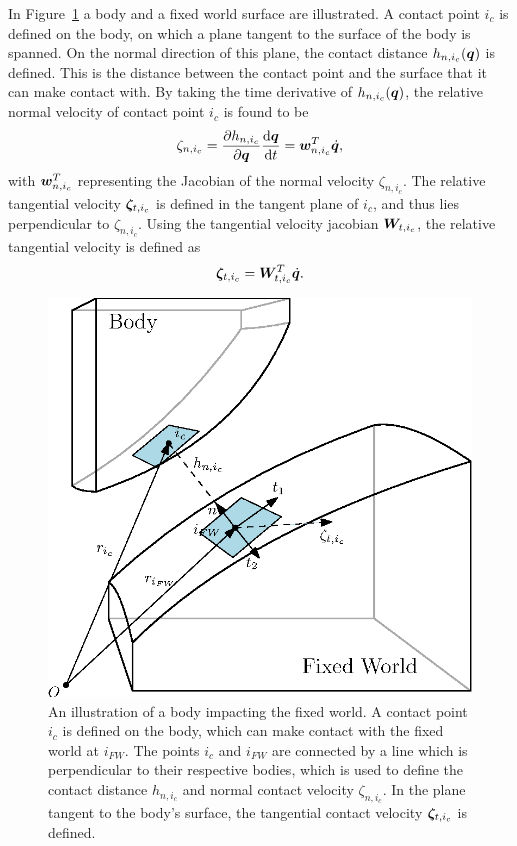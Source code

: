\documentclass[../DC2017114Bouma.tex]{subfiles}
\begin{document}
In Figure~\ref{fig:contactplanes} a body and a fixed world surface are illustrated. A contact point $i_c$ is defined on the body, on which a plane tangent to the surface of the body is spanned. On the normal direction of this plane, the contact distance $h_{n,i_c}({\boldsymbol{q}})$ is defined. This is the distance between the contact point and the surface that it can make contact with. By taking the time derivative of $h_{n,i_c}({\boldsymbol{q}})$, the relative normal velocity of contact point $i_c$ is found to be
\begin{align}
\zeta_{n,i_c} = \frac{\partial h_{n,i_c}}{\partial{\boldsymbol{q}}}\frac{\text{d}{\boldsymbol{q}}}{\text{d} t} = {\boldsymbol{w}}_{n,i_c}^T\dot{{\boldsymbol{q}}},
\end{align}
with ${\boldsymbol{w}}_{n,i_c}^T$ representing the Jacobian of the normal velocity $\zeta_{n,i_c}$. The relative tangential velocity $\boldsymbol{\zeta}_{t,i_c}$ is defined in the tangent plane of $i_c$, and thus lies perpendicular to $\zeta_{n,i_c}$. Using the tangential velocity jacobian ${\boldsymbol{W}}_{t,i_c}$, the relative tangential velocity is defined as
\begin{align}
\boldsymbol{\zeta}_{t,i_c} = {\boldsymbol{W}}_{t,i_c}^T\dot{{\boldsymbol{q}}}.
\end{align}

\begin{figure}[h]
\centering
\includegraphics[width=.6\textwidth]{contactplanes.eps}\caption{An illustration of a body impacting the fixed world. A contact point $i_c$ is defined on the body, which can make contact with the fixed world at $i_{FW}$. The points $i_c$ and $i_{FW}$ are connected by a line which is perpendicular to their respective bodies, which is used to define the contact distance $h_{n,i_c}$ and normal contact velocity $\zeta_{n,i_c}$. In the plane tangent to the body's surface, the tangential contact velocity $\boldsymbol{\zeta}_{t,i_c}$ is defined.} \label{fig:contactplanes}
\end{figure}
\end{document}
